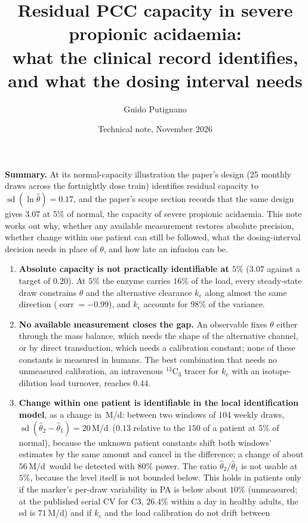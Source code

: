 \documentclass[11pt,a4paper]{article}
\title{\textbf{Residual PCC capacity in severe propionic acidaemia:\\
what the clinical record identifies, and what the dosing interval needs}}
\author{Guido Putignano}
\date{Technical note, November 2026}
\newcommand{\sdl}[1]{\operatorname{sd}(\ln #1)}
\newcommand{\um}{\,\textmu M/d}
\begin{document}
\maketitle

\noindent\colorbox{soft}{\parbox{\dimexpr\linewidth-2\fboxsep}{\small
\textbf{Summary.} At its normal-capacity illustration the paper's design (25 monthly draws
across the fortnightly dose train) identifies residual capacity to $\sdl{\hat\theta}=0.17$,
and the paper's scope section records that the same design gives $3.07$ at $5\%$ of normal,
the capacity of severe propionic acidaemia. This note works out why, whether any available
measurement restores absolute precision, whether change within one patient can still be
followed, what the dosing-interval decision needs in place of $\theta$, and how late an
infusion can be.
\begin{enumerate}[leftmargin=1.5em,topsep=3pt]
\item \textbf{Absolute capacity is not practically identifiable at $5\%$} ($3.07$ against a
target of $0.20$). At $5\%$ the enzyme carries $16\%$ of the load, every steady-state draw
constrains $\theta$ and the alternative clearance $k_e$ along almost the same direction
($\operatorname{corr}=-0.99$), and $k_e$ accounts for $98\%$ of the variance.
\item \textbf{No available measurement closes the gap.} An observable fixes $\theta$ either
through the mass balance, which needs the shape of the alternative channel, or by direct
transduction, which needs a calibration constant; none of these constants is measured in
humans. The best combination that needs no unmeasured calibration, an intravenous
$^{13}$C$_3$ tracer for $k_e$ with an isotope-dilution load turnover, reaches $0.44$.
\item \textbf{Change within one patient is identifiable in the local identification model}, as
a change in \um: between two windows of 104 weekly draws,
$\operatorname{sd}(\hat\theta_2-\hat\theta_1)=20$\um\ ($0.13$ relative to the $150$ of a patient at
$5\%$ of normal), because the unknown patient constants shift both windows' estimates by the same
amount and cancel in the difference; a change of about $56$\um\ would be detected with $80\%$
power. The ratio $\hat\theta_2/\hat\theta_1$ is not usable at $5\%$, because the level itself is
not bounded below. This holds in patients only if the marker's per-draw variability in PA is
below about $10\%$ (unmeasured; at the published serial CV for C3, $26.4\%$ within a day in
healthy adults, the sd is $71$\um) and if $k_e$ and the load calibration do not drift between

\end{enumerate}}}
\end{document}
